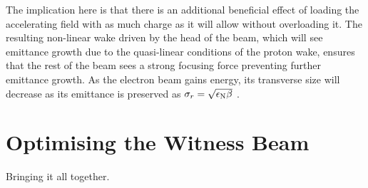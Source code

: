 The implication here is that there is an additional beneficial effect of loading the accelerating field with as much charge as it will allow without overloading it. The resulting non-linear wake driven by the head of the beam, which will see emittance growth due to the quasi-linear conditions of the proton wake, ensures that the rest of the beam sees a strong focusing force preventing further emittance growth. As the electron beam gains energy, its transverse size will decrease as its emittance is preserved as $\sigma_{r} = \sqrt{\epsilon_{\mathrm{N}}\beta}$ \cite{wille:2001}.


\section{Optimising the Witness Beam}
\label{Sim:Opt}

Bringing it all together.

